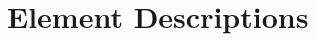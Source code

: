 \documentclass[a4paper,12pt,twoside]{article}
\begin{document}

\section{Element Descriptions}

\newpage

\end{document}
